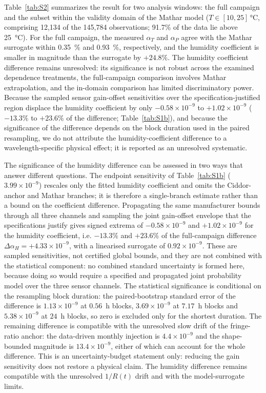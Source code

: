 \documentclass[aps,prapplied,reprint,superscriptaddress]{revtex4-2}
\begin{document}
Table~\ref{tab:S2} summarizes the result for two analysis windows: the full campaign and the subset within the validity domain of the Mathar model ($T \in [10, 25]\,\si{\degreeCelsius}$, comprising 12,134 of the 145,784 observations; 91.7\% of the data lie above \SI{25}{\degreeCelsius}). For the full campaign, the measured $\alpha_T$ and $\alpha_P$ agree with the Mathar surrogate within \SI{0.35}{\percent} and \SI{0.93}{\percent}, respectively, and the humidity coefficient is smaller in magnitude than the surrogate by $+24.8\%$. The humidity coefficient difference remains unresolved: its significance is not robust across the examined dependence treatments, the full-campaign comparison involves Mathar extrapolation, and the in-domain comparison has limited discriminatory power. Because the sampled sensor gain-offset sensitivities over the specification-justified region displace the humidity coefficient by only $-0.58 \times 10^{-9}$ to $+1.02 \times 10^{-9}$ ($-13.3\%$ to $+23.6\%$ of the difference; Table~\ref{tab:S1b}), and because the significance of the difference depends on the block duration used in the paired resampling, we do not attribute the humidity-coefficient difference to a wavelength-specific physical effect; it is reported as an unresolved systematic.

The significance of the humidity difference can be assessed in two ways that answer different questions. The endpoint sensitivity of Table~\ref{tab:S1b} ($3.99 \times 10^{-9}$) rescales only the fitted humidity coefficient and omits the Ciddor-anchor and Mathar branches; it is therefore a single-branch estimate rather than a bound on the coefficient difference. Propagating the same manufacturer bounds through all three channels and sampling the joint gain-offset envelope that the specifications justify gives signed extrema of $-0.58 \times 10^{-9}$ and $+1.02 \times 10^{-9}$ for the humidity coefficient, i.e. $-13.3\%$ and $+23.6\%$ of the full-campaign difference $\Delta\alpha_H = +4.33 \times 10^{-9}$, with a linearised surrogate of $0.92 \times 10^{-9}$. These are sampled sensitivities, not certified global bounds, and they are not combined with the statistical component: no combined standard uncertainty is formed here, because doing so would require a specified and propagated joint probability model over the three sensor channels. The statistical significance is conditional on the resampling block duration: the paired-bootstrap standard error of the difference is $1.13 \times 10^{-9}$ at $0.56$~h blocks, $3.69 \times 10^{-9}$ at $7.17$~h blocks and $5.38 \times 10^{-9}$ at $24$~h blocks, so zero is excluded only for the shortest duration. The remaining difference is compatible with the unresolved slow drift of the fringe-ratio anchor: the data-driven monthly injection is $4.4 \times 10^{-9}$ and the shape-bounded magnitude is $13.4 \times 10^{-9}$, either of which can account for the whole difference. This is an uncertainty-budget statement only: reducing the gain sensitivity does not restore a physical claim. The humidity difference remains compatible with the unresolved $1/R(t)$ drift and with the model-surrogate limits.
\end{document}
